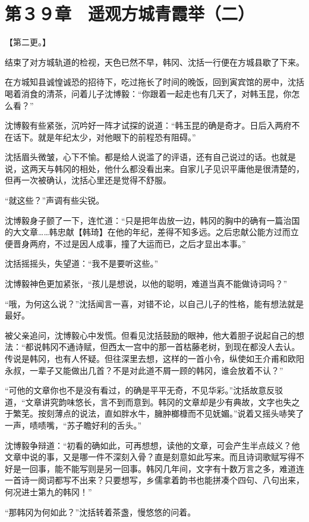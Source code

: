 \section{第３９章　遥观方城青霞举（二）}

【第二更。】

结束了对方城轨道的检视，天色已然不早，韩冈、沈括一行便在方城县歇了下来。

在方城知县诚惶诚恐的招待下，吃过拖长了时间的晚饭，回到寅宾馆的房中，沈括喝着消食的清茶，问着儿子沈博毅：“你跟着一起走也有几天了，对韩玉昆，你怎么看？”

沈博毅有些紧张，沉吟好一阵才试探的说道：“韩玉昆的确是奇才。日后入两府不在话下。就是年纪太少，对他眼下的前程恐有阻碍。”

沈括眉头微皱，心下不愉。都是给人说滥了的评语，还有自己说过的话。也就是说，这两天与韩冈的相处，他什么都没看出来。自家儿子见识平庸他是很清楚的，但再一次被确认，沈括心里还是觉得不舒服。

“就这些？”声调有些尖锐。

沈博毅身子颤了一下，连忙道：“只是把年齿放一边，韩冈的胸中的确有一篇治国的大文章……韩忠献【韩琦】在他的年纪，差得不知多远。之后忠献公能方过而立便晋身两府，不过是因人成事，撞了大运而已，之后才显出本事。”

沈括摇摇头，失望道：“我不是要听这些。”

沈博毅神色更加紧张，“孩儿是想说，以他的聪明，难道当真不能做诗词吗？”

“哦，为何这么说？”沈括闻言一喜，对错不论，以自己儿子的性格，能有想法就是最好。

被父亲追问，沈博毅心中发慌。但看见沈括鼓励的眼神，他大着胆子说起自己的想法：“都说韩冈不通诗赋，但西太一宫中的那一首枯藤老树，到现在都没人去认。传说是韩冈，也有人怀疑。但往深里去想，这样的一首小令，纵使如王介甫和欧阳永叔，一辈子又能做出几首？不是对此道不屑一顾的韩冈，谁会放着不认？”

“可他的文章你也不是没有看过，的确是平平无奇，不见华彩。”沈括故意反驳道，“文章讲究韵味悠长，言不到而意到。韩冈的文章却是少有典故，文字也失之于繁芜。按刻薄点的说法，直如胖水牛，臃肿榔槺而不见妩媚。”说着又摇头哧笑了一声，啧啧嘴，“苏子瞻好利的舌头。”

沈博毅争辩道：“初看的确如此，可再想想，读他的文章，可会产生半点歧义？他文章中说的事，又是哪一件不深刻入骨？直是刻意如此写来。而且诗词歌赋写得不好是一回事，能不能写则是另一回事。韩冈几年间，文字有十数万言之多，难道连一首诗一阕词都写不出来？只要想写，乡儒拿着韵书也能拼凑个四句、八句出来，何况进士第九的韩冈！”

“那韩冈为何如此？”沈括转着茶盏，慢悠悠的问着。

